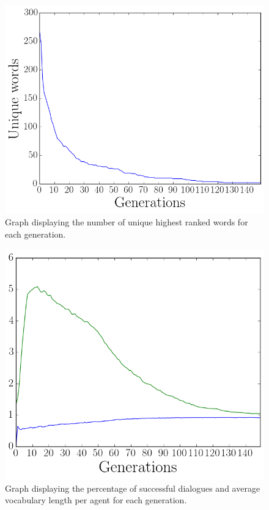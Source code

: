 \begin{figure}[htbp]
    \centering
    \includegraphics[scale=0.5]{fig/Results/Exp6/UniqueWords1}
    \caption{Graph displaying the number of unique highest ranked words for each generation.}
    \label{fig:UniqueWords6}
\end{figure}
\begin{figure}[htbp]
    \centering
    \includegraphics[scale=0.5]{fig/Results/Exp6/Vocabulary1}
    \caption{Graph displaying the percentage of successful dialogues and average vocabulary length per agent for each generation.}
    \label{fig:Vocabulary6}
\end{figure}

